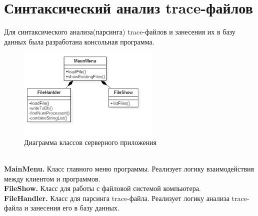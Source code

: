 \section{Синтаксический анализ trace-файлов}
Для синтаксического анализа(парсинга) trace-файлов и занесения их в базу данных была разработана консольная программа.
\begin{figure}[h!]
	\centering
	\includegraphics[width=0.6\textwidth]{img/server.png}
	\caption{Диаграмма классов серверного приложения}
	\label{fig:spire11}
\end{figure}
\\ \textbf{MainMenu.} Класс главного меню программы. Реализует логику взаимодействия между клиентом и программов. \\
\textbf{FileShow.} Класс для работы с файловой системой компьютера. \\
\textbf{FileHandler.} Класс для парсинга trace-файла. Реализует логику анализа trace-файла и занесения его в базу данных.
